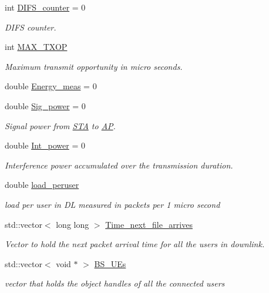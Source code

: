 \begin{DoxyCompactItemize}
int \hyperlink{classAP_ae8b5098c1fed76aeecdb1ed35f8952a1}{D\-I\-F\-S\-\_\-counter} = 0
\begin{DoxyCompactList}\small\item\em D\-I\-F\-S counter. \end{DoxyCompactList}\item 
int \hyperlink{classAP_a0952981af3bebf7dcc9fabe94875dc7b}{M\-A\-X\-\_\-\-T\-X\-O\-P}
\begin{DoxyCompactList}\small\item\em Maximum transmit opportunity in micro seconds. \end{DoxyCompactList}\item 
double \hyperlink{classAP_a71f625e0df8f494e53ab6e27a2e96bd9}{Energy\-\_\-meas} = 0
\item 
double \hyperlink{classAP_a39256449e3187dd7b8bdd1cfa0fbb2da}{Sig\-\_\-power} = 0
\begin{DoxyCompactList}\small\item\em Signal power from \hyperlink{classSTA}{S\-T\-A} to \hyperlink{classAP}{A\-P}. \end{DoxyCompactList}\item 
double \hyperlink{classAP_a6c2c3e61c88d4bba7d949f5663b3ea10}{Int\-\_\-power} = 0
\begin{DoxyCompactList}\small\item\em Interference power accumulated over the transmission duration. \end{DoxyCompactList}\item 
double \hyperlink{classAP_a3e8b289d2aa54fd8898e145fc605907b}{load\-\_\-peruser}
\begin{DoxyCompactList}\small\item\em load per user in D\-L measured in packets per 1 micro second \end{DoxyCompactList}\item 
std\-::vector$<$ long long $>$ \hyperlink{classAP_a21b0b1203a2a7701c66b6c5a803b0160}{Time\-\_\-next\-\_\-file\-\_\-arrives}
\begin{DoxyCompactList}\small\item\em Vector to hold the next packet arrival time for all the users in downlink. \end{DoxyCompactList}\item 
std\-::vector$<$ void $\ast$ $>$ \hyperlink{classAP_ab4709e5956576b8131ae0c63af5c1151}{B\-S\-\_\-\-U\-Es}
\begin{DoxyCompactList}\small\item\em vector that holds the object handles of all the connected users \end{DoxyCompactList}\item 

\end{DoxyCompactItemize}
